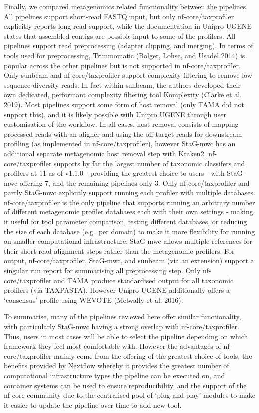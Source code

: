 \documentclass[
]{article}
\begin{document}
Finally, we compared metagenomics related functionality between the
pipelines. All pipelines support short-read FASTQ input, but only
nf-core/taxprofiler explicitly reports long-read support, while the
documentation in Unipro UGENE states that assembled contigs are possible
input to some of the profilers. All pipelines support read preprocessing
(adapter clipping, and merging). In terms of tools used for
preprocessing, Trimmomatic (Bolger, Lohse, and Usadel 2014) is popular
across the other pipelines but is not supported in nf-core/taxprofiler.
Only sunbeam and nf-core/taxprofiler support complexity filtering to
remove low sequence diversity reads. In fact within sunbeam, the authors
developed their own dedicated, performant complexity filtering tool
Komplexity (Clarke et al. 2019). Most pipelines support some form of
host removal (only TAMA did not support this), and it is likely possible
with Unipro UGENE through user customisation of the workflow. In all
cases, host removal consists of mapping processed reads with an aligner
and using the off-target reads for downstream profiling (as implemented
in nf-core/taxprofiler), however StaG-mwc has an additional separate
metagenomic host removal step with Kraken2. nf-core/taxprofiler supports
by far the largest number of taxonomic classifers and profilers at 11 as
of v1.1.0 - providing the greatest choice to users - with StaG-mwc
offering 7, and the remaining pipelines only 3. Only nf-core/taxprofiler
and partly StaG-mwc explicitly support running each profiler with
multiple databases. nf-core/taxprofiler is the only pipeline that
supports running an arbitrary number of different metagenomic profiler
databases each with their own settings - making it useful for tool
parameter comparison, testing different databases, or reducing the size
of each database (e.g.~per domain) to make it more flexibility for
running on smaller computational infrastructure. StaG-mwc allows
multiple references for their short-read alignment steps rather than the
metagenomic profilers. For output, nf-core/taxprofiler, StaG-mwc, and
sunbeam (via an extension) support a singular run report for summarising
all preprocessing step. Only nf-core/taxprofiler and TAMA produce
standardised output for all taxonomic profilers (via TAXPASTA). However
Unipro UGENE additionally offers a `consensus' profile using WEVOTE
(Metwally et al. 2016).

To summarise, many of the pipelines reviewed here offer similar
functionality, with particularly StaG-mwc having a strong overlap with
nf-core/taxprofiler. Thus, users in most cases will be able to select
the pipeline depending on which framework they feel most comfortable
with. However the advantages of nf-core/taxprofiler mainly come from the
offering of the greatest choice of tools, the benefits provided by
Nextflow whereby it provides the greatest number of computational
infrastructure types the pipeline can be executed on, and container
systems can be used to ensure reproducibility, and the support of the
nf-core community due to the centralised pool of `plug-and-play' modules
to make it easier to update the pipeline over time to add new tool.
\end{document}
